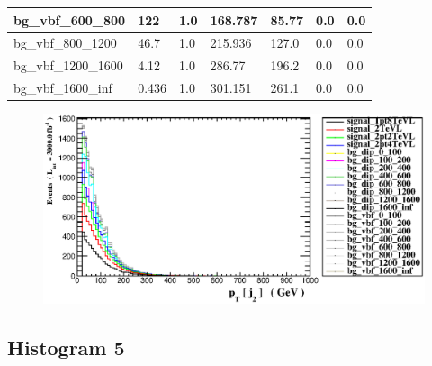\documentclass[a4paper, 10pt]{article}
\begin{document}
\begin{table}[H]
\begin{center}
\begin{tabular}{|m{23.0mm}|m{23.0mm}|m{18.0mm}|m{19.0mm}|m{19.0mm}|m{19.0mm}|m{19.0mm}|}
      \hline
      {\cellcolor{white}         bg\_vbf\_600\_800}& {\cellcolor{white}         122}& {\cellcolor{white}         1.0}& {\cellcolor{white}         168.787}& {\cellcolor{white}         85.77}& {\cellcolor{green}         0.0}& {\cellcolor{green}         0.0}\\
      \hline
      {\cellcolor{white}         bg\_vbf\_800\_1200}& {\cellcolor{white}         46.7}& {\cellcolor{white}         1.0}& {\cellcolor{white}         215.936}& {\cellcolor{white}         127.0}& {\cellcolor{green}         0.0}& {\cellcolor{green}         0.0}\\
      \hline
      {\cellcolor{white}         bg\_vbf\_1200\_1600}& {\cellcolor{white}         4.12}& {\cellcolor{white}         1.0}& {\cellcolor{white}         286.77}& {\cellcolor{white}         196.2}& {\cellcolor{green}         0.0}& {\cellcolor{green}         0.0}\\
      \hline
      {\cellcolor{white}         bg\_vbf\_1600\_inf}& {\cellcolor{white}         0.436}& {\cellcolor{white}         1.0}& {\cellcolor{white}         301.151}& {\cellcolor{white}         261.1}& {\cellcolor{green}         0.0}& {\cellcolor{green}         0.0}\\
\hline
    \end{tabular}
  \end{center}
\end{table}

\begin{figure}[H]
  \begin{center}
    \includegraphics[scale=0.45]{selection_3.eps}\\
\caption{   }
  \end{center}
\end{figure}
      \newpage
\subsection{ Histogram 5}
\end{document}

